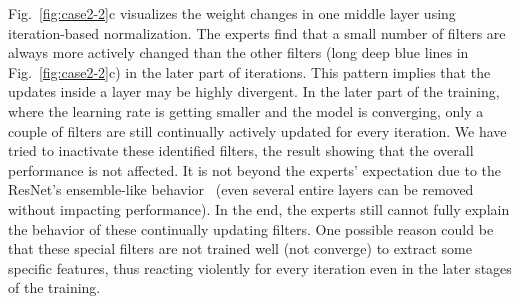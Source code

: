 \documentclass[format=acmsmall, review=false, screen=true]{acmart}
\newcommand{\dy}{\textcolor[rgb]{0,0,0}}
\begin{document}
Fig.~\ref{fig:case2-2}c visualizes the weight changes in one middle layer using iteration-based normalization.
The experts find that a small number of filters are always more actively changed than the other filters (long deep blue lines in Fig.~\ref{fig:case2-2}c) in the later part of iterations.
This pattern implies that the updates inside a layer may be highly divergent.
\dy{In the later part of the training, where the learning rate is getting smaller and the model is converging, only a couple of filters are still continually actively updated for every iteration.
We have tried to inactivate these identified filters, the result showing that the overall performance is not affected.
It is not beyond the experts' expectation due to the ResNet's ensemble-like behavior~\cite{veit2016residual} (even several entire layers can be removed without impacting performance). In the end, the experts still cannot fully explain the behavior of these continually updating filters. One possible reason could be that these special filters are not trained well (not converge) to extract some specific features, thus reacting violently for every iteration even in the later stages of the training.}%
\end{document}

